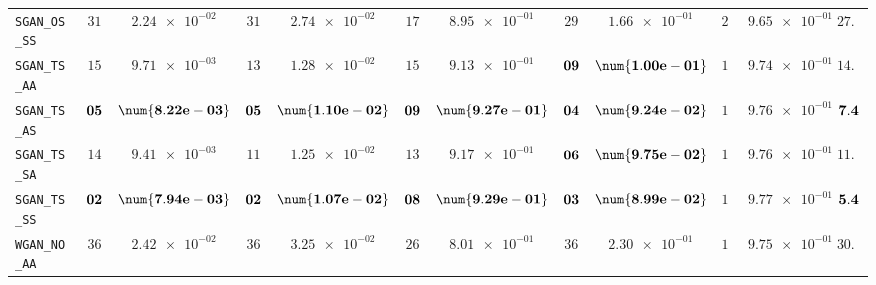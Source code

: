 \begin{xltabular}{\textwidth}{l||cC|cC|cC|cC|cC||c}
	\texttt{SGAN\_OS\_SS} & $ 31$ & $ \num{2.24e-02}$ & $ 31$ & $ \num{2.74e-02}$ & $ 17$ & $ \num{8.95e-01}$ & $ 29$ & $ \num{1.66e-01}$ & $ 29$ & $ \num{9.65e-01}$ & $ 27.4$  \\
	\texttt{SGAN\_TS\_AA} & $ 15$ & $ \num{9.71e-03}$ & $ 13$ & $ \num{1.28e-02}$ & $ 15$ & $ \num{9.13e-01}$ & $\bf 09$ & $\bf \num{1.00e-01}$ & $ 18$ & $ \num{9.74e-01}$ & $ 14.0$  \\
	\texttt{SGAN\_TS\_AS} & $\bf 05$ & $\bf \num{8.22e-03}$ & $\bf 05$ & $\bf \num{1.10e-02}$ & $\bf 09$ & $\bf \num{9.27e-01}$ & $\bf 04$ & $\bf \num{9.24e-02}$ & $ 14$ & $ \num{9.76e-01}$ & $\bf 7.4$  \\
	\texttt{SGAN\_TS\_SA} & $ 14$ & $ \num{9.41e-03}$ & $ 11$ & $ \num{1.25e-02}$ & $ 13$ & $ \num{9.17e-01}$ & $\bf 06$ & $\bf \num{9.75e-02}$ & $ 13$ & $ \num{9.76e-01}$ & $ 11.4$  \\
	\texttt{SGAN\_TS\_SS} & $\bf 02$ & $\bf \num{7.94e-03}$ & $\bf 02$ & $\bf \num{1.07e-02}$ & $\bf 08$ & $\bf \num{9.29e-01}$ & $\bf 03$ & $\bf \num{8.99e-02}$ & $ 12$ & $ \num{9.77e-01}$ & $\bf 5.4$  \\ \midrule
	\texttt{WGAN\_NO\_AA} & $ 36$ & $ \num{2.42e-02}$ & $ 36$ & $ \num{3.25e-02}$ & $ 26$ & $ \num{8.01e-01}$ & $ 36$ & $ \num{2.30e-01}$ & $ 17$ & $ \num{9.75e-01}$ & $ 30.2$  \\

\end{xltabular}
